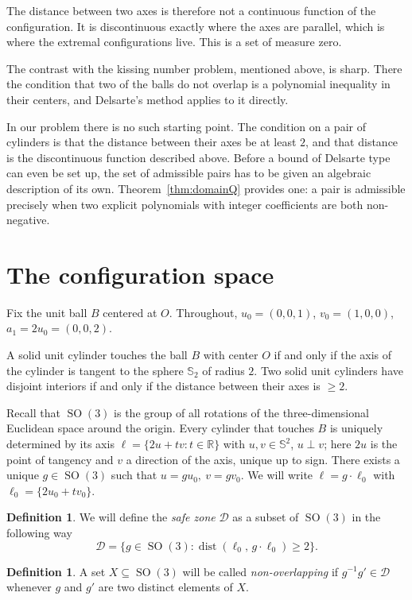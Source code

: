\documentclass[reqno]{amsart}
\theoremstyle{definition}
\newtheorem{definition}[theorem]{Definition}
\DeclareMathOperator{\SO}{SO}
\DeclareMathOperator{\dist}{dist}
\newcommand{\R}{\mathbb{R}}
\newcommand{\Sph}{\mathbb{S}}
\newcommand{\Dom}{\mathcal{D}}
\begin{document}
The distance between two axes is therefore not a continuous function of the configuration. It is
discontinuous exactly where the axes are parallel, which is where the extremal configurations live.
This is a set of measure zero. 

The contrast with the kissing number problem, mentioned above, is sharp. There the condition that
two of the balls do not overlap is a polynomial inequality in their centers, and Delsarte's method
applies to it directly.

In our problem there is no such starting point. The condition on a pair of cylinders is that the
distance between their axes be at least $2$, and that distance is the discontinuous function
described above. Before a bound of Delsarte type can even be set up, the set of admissible pairs
has to be given an algebraic description of its own. Theorem~\ref{thm:domainQ} provides one: a
pair is admissible precisely when two explicit polynomials with integer coefficients are both
non-negative.

\section{The configuration space}\label{sec:reduction}

Fix the unit ball $B$ centered at $O$. Throughout, $u_0=(0,0,1)$, $v_0=(1,0,0)$, $a_1=2u_0=(0,0,2)$.

A solid unit cylinder touches the ball $B$ with center $O$ if and only if the axis
of the cylinder is tangent to the sphere $\Sph_2$ of radius $2$. Two solid unit cylinders have
disjoint interiors if and only if the distance between their axes is $\ge2$.

Recall that $\SO(3)$ is the group of all rotations of the three-dimensional Euclidean space around
the origin. Every cylinder that touches $B$ is uniquely determined by its axis
$\ell=\{2u+tv:t\in\R\}$ with $u,v\in\Sph^2$, $u\perp v$; here $2u$ is the point of tangency and
$v$ a direction of the axis, unique up to sign. There exists a unique $g\in\SO(3)$ such that
$u=gu_0,\ v=gv_0$. We will write $\ell=g\cdot\ell_0$ with $\ell_0=\{2u_0+tv_0\}$.

\begin{definition}\label{def:D}
We will define the \emph{safe zone} $\Dom$ as a subset of $\SO(3)$ in the following way
\[ \Dom=\{g\in\SO(3):\dist(\ell_0,\,g\cdot\ell_0)\ge2\}.\]
\end{definition}

\begin{definition}\label{def:nonOverlappingX}
A set $X\subseteq \SO(3)$ will be called \emph{non-overlapping} if
$g^{-1}g'\in\Dom$ whenever $g$ and $g'$ are two distinct elements of $X$.
\end{definition}
\end{document}
